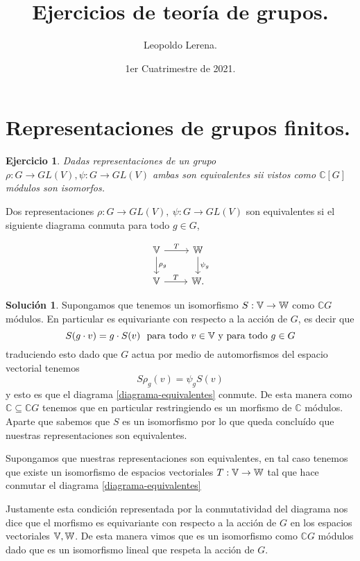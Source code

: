 \documentclass[11pt]{article}
\title{\color{red!55!black} Ejercicios de teoría de grupos.}
\author{Leopoldo Lerena.}
\date{1er Cuatrimestre de 2021.}
\theoremstyle{plain}
\newtheorem*{ej}{Ejercicio}
\theoremstyle{definition}
\newtheorem*{sol}{Solución}
\theoremstyle{remark}
\newcommand\CC{\mathbb{C}}
\begin{document}
\maketitle
\section{Representaciones de grupos finitos.}
\bigskip
\begin{tcolorbox}[colback=teal!20!white,colframe=teal!65!black]
\begin{ej}
	Dadas representaciones de un grupo $\rho: G \to GL(V), \psi: G \to GL(V)$ ambas son equivalentes sii vistos como $\CC[G]$ módulos son isomorfos.
\end{ej}	
\end{tcolorbox}
\medskip

Dos representaciones $\rho: G \to GL(V), \  \psi: G \to GL(V)$ son equivalentes si el siguiente diagrama conmuta para todo $g \in G$,

\begin{equation}\label{diagrama-equivalentes}
\begin{tikzcd}
\Bbb V  \arrow{d}{\rho_g} \arrow{r}{T}   &  \Bbb W \arrow{d}{\psi_g}  \\
\Bbb V \arrow{r}{T}     &  \Bbb W .
\end{tikzcd}
\end{equation}
\medskip
\begin{sol}	
	Supongamos que tenemos un isomorfismo $S: \Bbb V \to \Bbb W$ como $\CC G$ módulos. En particular es equivariante con respecto a la acción de $G$, es decir que 
	\[
	S(g \cdot v) = g \cdot S(v) \ \  \text{para todo} \ v \in \Bbb V \ \text{y para todo} \ g \in G
	\]
	traduciendo esto dado que $G$ actua por medio de automorfismos del espacio vectorial tenemos 
	\[
	S \rho_g (v) = \psi_g S(v)
	\]
	y esto es que el diagrama \ref{diagrama-equivalentes} conmute.  De esta manera como $\CC \subseteq \CC G$ tenemos que en particular restringiendo es un morfismo de $\CC$ módulos. Aparte que sabemos que $S$ es un isomorfismo por lo que queda concluído que nuestras representaciones son equivalentes.
	
	Supongamos que nuestras representaciones son equivalentes, en tal caso tenemos que existe un isomorfismo de espacios vectoriales $T: \Bbb V \to \Bbb W$ tal que hace conmutar el diagrama \ref{diagrama-equivalentes}
	
	Justamente esta condición representada por la conmutatividad del diagrama nos dice que el morfismo es equivariante con respecto a la acción de $G$ en los espacios vectoriales $\Bbb V, \Bbb W$. De esta manera vimos que es un isomorfismo como $\CC G$ módulos dado que es un isomorfismo lineal que respeta la acción de $G$.
\end{sol}
\end{document}
